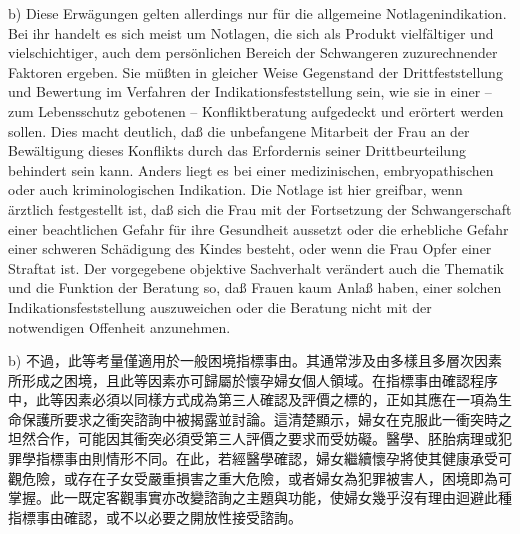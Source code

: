 \documentclass[12pt]{article}
\begin{document}
\begin{sourcepara}[title={原文D.81}]
b) Diese Erwägungen gelten allerdings nur für die allgemeine Notlagenindikation. Bei ihr handelt es sich meist um Notlagen, die sich als Produkt vielfältiger und vielschichtiger, auch dem persönlichen Bereich der Schwangeren zuzurechnender Faktoren ergeben. Sie müßten in gleicher Weise Gegenstand der Drittfeststellung und Bewertung im Verfahren der Indikationsfeststellung sein, wie sie in einer -- zum Lebensschutz gebotenen -- Konfliktberatung aufgedeckt und erörtert werden sollen. Dies macht deutlich, daß die unbefangene Mitarbeit der Frau an der Bewältigung dieses Konflikts durch das Erfordernis seiner Drittbeurteilung behindert sein kann. Anders liegt es bei einer medizinischen, embryopathischen oder auch kriminologischen Indikation. Die Notlage ist hier greifbar, wenn ärztlich festgestellt ist, daß sich die Frau mit der Fortsetzung der Schwangerschaft einer beachtlichen Gefahr für ihre Gesundheit aussetzt oder die erhebliche Gefahr einer schweren Schädigung des Kindes besteht, oder wenn die Frau Opfer einer Straftat ist. Der vorgegebene objektive Sachverhalt verändert auch die Thematik und die Funktion der Beratung so, daß Frauen kaum Anlaß haben, einer solchen Indikationsfeststellung auszuweichen oder die Beratung nicht mit der notwendigen Offenheit anzunehmen.
\end{sourcepara}
\begin{transpara}
b) 不過，此等考量僅適用於一般困境指標事由。其通常涉及由多樣且多層次因素所形成之困境，且此等因素亦可歸屬於懷孕婦女個人領域。在指標事由確認程序中，此等因素必須以同樣方式成為第三人確認及評價之標的，正如其應在一項為生命保護所要求之衝突諮詢中被揭露並討論。這清楚顯示，婦女在克服此一衝突時之坦然合作，可能因其衝突必須受第三人評價之要求而受妨礙。醫學、胚胎病理或犯罪學指標事由則情形不同。在此，若經醫學確認，婦女繼續懷孕將使其健康承受可觀危險，或存在子女受嚴重損害之重大危險，或者婦女為犯罪被害人，困境即為可掌握。此一既定客觀事實亦改變諮詢之主題與功能，使婦女幾乎沒有理由迴避此種指標事由確認，或不以必要之開放性接受諮詢。
\end{transpara}
\end{document}
